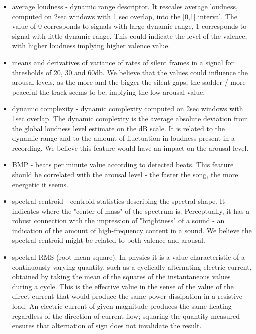 \begin{itemize}

\item average loudness - dynamic range descriptor. It rescales average loudness, computed on 2sec windows with 1 sec overlap, into the [0,1] interval. The value of 0 corresponds to signals with large dynamic range, 1 corresponds to signal with little dynamic range. This could indicate the level of the valence, with higher loudness implying higher valence value.

\item means and derivatives of variance of rates of silent frames in a signal for thresholds of 20, 30 and 60db. We believe that the values could influence the arousal levels, as the more and the bigger the silent gaps, the sadder / more peaceful the track seems to be, implying the low arousal value.

\item dynamic complexity - dynamic complexity computed on 2sec windows with 1sec overlap. The dynamic complexity is the average absolute deviation from the global loudness level estimate on the dB scale. It is related to the dynamic range and to the amount of fluctuation in loudness present in a recording. We believe this feature would have an impact on the arousal level.

\item BMP - beats per minute value according to detected beats. This feature should be correlated with the arousal level - the faster the song, the more energetic it seems. 

\item spectral centroid - centroid statistics describing the spectral shape. It indicates where the "center of mass" of the spectrum is. Perceptually, it has a robust connection with the impression of "brightness" of a sound - an indication of the amount of high-frequency content in a sound. We believe the spectral centroid might be related to both valence and arousal.

\item spectral RMS (root mean square). In physics it is a value characteristic of a continuously varying quantity, such as a cyclically alternating electric current, obtained by taking the mean of the squares of the instantaneous values during a cycle. This is the effective value in the sense of the value of the direct current that would produce the same power dissipation in a resistive load. An electric current of given magnitude produces the same heating regardless of the direction of current flow; squaring the quantity measured ensures that alternation of sign does not invalidate the result.


\end{itemize}
